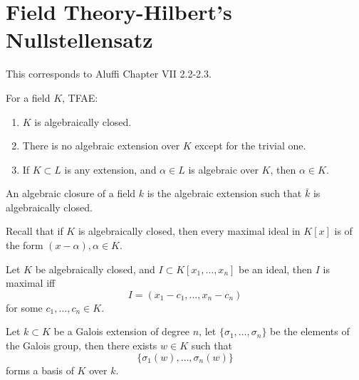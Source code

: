 \documentclass[openany]{book}
\begin{document}
\chapter{Field Theory-Hilbert's Nullstellensatz}
This corresponds to Aluffi Chapter VII 2.2-2.3.


\begin{prop}
    For a field $K$, TFAE:
    \begin{enumerate}
        \item $K$ is algebraically closed.
        \item There is no algebraic extension over $K$ except for the trivial one.
        \item If $K\subset L$ is any extension, and $\alpha\in L$ is algebraic over $K$, then $\alpha\in K$.
    \end{enumerate}
\end{prop}

\begin{defn}
    An algebraic closure of a field $k$ is the algebraic extension such that $\bar{k}$ is algebraically closed.
\end{defn}

\begin{prop}
    Recall that if $K$ is algebraically closed, then every maximal ideal in $K[x]$ is of the form $(x-\alpha),\alpha\in K$.
\end{prop}
\begin{prop}
    Let $K$ be algebraically closed, and $I\subset K[x_1,\dots,x_n]$ be an ideal, then $I$ is maximal iff 
    \begin{equation*}
        I=(x_1-c_1,\dots, x_n-c_n)
    \end{equation*}
    for some $c_1,\dots,c_n\in K$.
\end{prop}










\begin{prop}
    Let $k\subset K$ be a Galois extension of degree $n$, let $\{\sigma_1,\dots,\sigma_n\}$ be the elements of the Galois group, then there exists $w\in K$ such that 
    \begin{equation*}
        \{\sigma_1(w),\dots, \sigma_n(w)\}
    \end{equation*}
    forms a basis of $K$ over $k$.
\end{prop}
\end{document}
